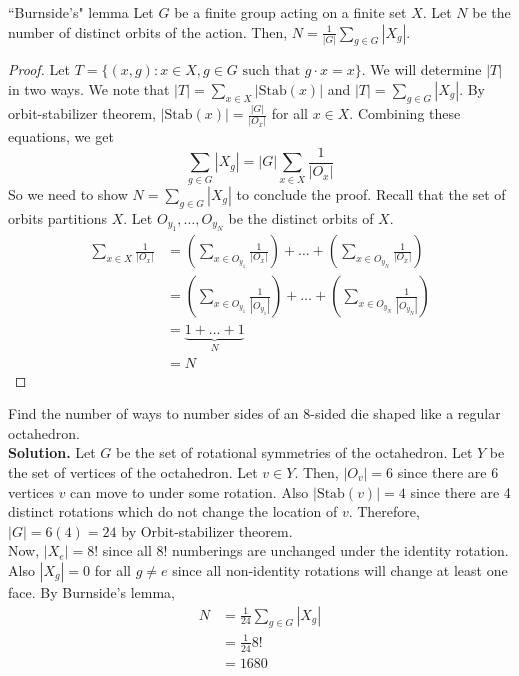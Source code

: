 \documentclass[12pt]{article}
\newcommand{\Stab}{\text{Stab}}
\begin{document}
	\begin{mylem}{``Burnside's" lemma}{}
		Let $G$ be a finite group acting on a finite set $X$. Let $N$ be the number of distinct orbits of the action. Then, $N=\frac{1}{|G|}\sum_{g\in G}|X_g|$.
		\begin{proof}
			Let $T=\{(x, g):x\in X, g\in G\text{ such that }g\cdot x=x\}$. We will determine $|T|$ in two ways. We note that $|T|=\sum_{x\in X}|\Stab(x)|$ and $|T|=\sum_{g\in G}|X_g|$. By orbit-stabilizer theorem, $|\Stab(x)|=\frac{|G|}{|O_x|}$ for all $x\in X$. Combining these equations, we get
			\[ \sum_{g\in G}|X_g|=|G|\sum_{x\in X}\frac{1}{|O_x|} \]
			So we need to show $N=\sum_{g\in G}|X_g|$ to conclude the proof. Recall that the set of orbits partitions $X$. Let $O_{y_1}, \dots, O_{y_N}$ be the distinct orbits of $X$.
			\begin{align*}
				\sum_{x\in X}\frac{1}{|O_x|}&=\left(\sum_{x\in O_{y_1}}\frac{1}{|O_x|}\right)+\dots+\left(\sum_{x\in O_{y_N}}\frac{1}{|O_x|}\right)\\
				&=\left(\sum_{x\in O_{y_1}}\frac{1}{|O_{y_1}|}\right)+\dots+\left(\sum_{x\in O_{y_N}}\frac{1}{|O_{y_N}|}\right)\\
				&=\underbrace{1+\dots+1}_{N}\\
				&=N
			\end{align*}
		\end{proof}
	\end{mylem}
	
	\begin{myex}{}{}
		Find the number of ways to number sides of an 8-sided die shaped like a regular octahedron.\\
		
		\textbf{Solution.} Let $G$ be the set of rotational symmetries of the octahedron. Let $Y$ be the set of vertices of the octahedron. Let $v\in Y$. Then, $|O_v|=6$ since there are 6 vertices $v$ can move to under some rotation. Also $|\Stab(v)|=4$ since there are 4 distinct rotations which do not change the location of $v$. Therefore, $|G|=6(4)=24$ by Orbit-stabilizer theorem.\\
		
		Now, $|X_e|=8!$ since all $8!$ numberings are unchanged under the identity rotation. Also $|X_g|=0$ for all $g\neq e$ since all non-identity rotations will change at least one face. By Burnside's lemma,
		\begin{align*}
			N&=\frac{1}{24}\sum_{g\in G}|X_g|\\
			&=\frac{1}{24}8!\\
			&=1680
		\end{align*}
	\end{myex}
	
\end{document}
